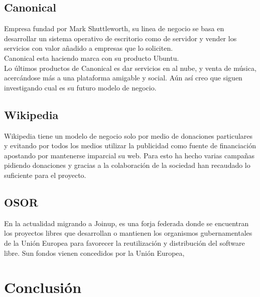 \documentclass[12pt]{article} %
\begin{document}
\subsection{Canonical} %

Empresa fundad por Mark Shuttleworth, su linea de negocio se basa en desarrollar un sistema operativo de escritorio como de servidor y vender los servicios con valor añadido a empresas que lo soliciten.\\Canonical esta haciendo marca con su producto Ubuntu.\\Lo últimos productos de Canonical es dar servicios en al nube, y venta de música, acercándose más a una plataforma amigable y social. Aún así creo que siguen investigando cual es su futuro modelo de negocio.
\subsection{Wikipedia} %

Wikipedia tiene un modelo de negocio solo por medio de donaciones particulares y evitando por todos los medios utilizar la publicidad como fuente de financiación  apostando por mantenerse imparcial su web. Para esto ha hecho varias campañas pidiendo donaciones y gracias a la colaboración de la sociedad han recaudado lo suficiente para el proyecto.

\subsection{OSOR} %

En la actualidad migrando a Joinup, es una forja federada donde se encuentran los proyectos libres que desarrollan o mantienen los organismos gubernamentales de la Unión Europea para favorecer la reutilización y distribución del software libre. Sun fondos vienen concedidos por la Unión Europea, 

\section{Conclusión}  
\end{document}
